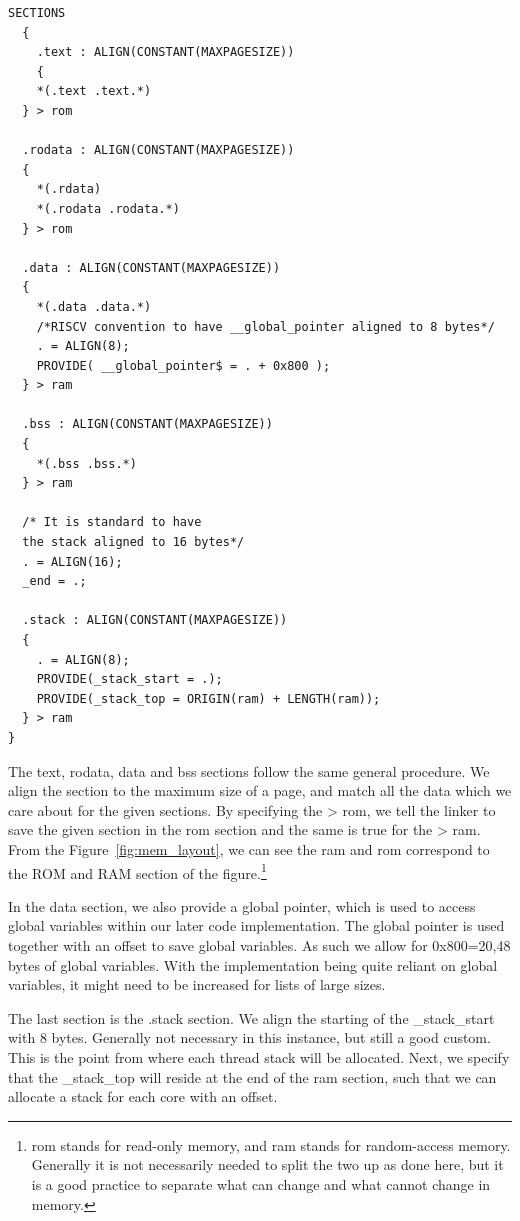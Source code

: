 \begin{lstlisting}[caption=Linker scripts SECTIONS.]
  SECTIONS
  {
    .text : ALIGN(CONSTANT(MAXPAGESIZE))
    {
    *(.text .text.*)
  } > rom

  .rodata : ALIGN(CONSTANT(MAXPAGESIZE))
  {
    *(.rdata)
    *(.rodata .rodata.*)
  } > rom

  .data : ALIGN(CONSTANT(MAXPAGESIZE))
  {
    *(.data .data.*)
    /*RISCV convention to have __global_pointer aligned to 8 bytes*/
    . = ALIGN(8);
    PROVIDE( __global_pointer$ = . + 0x800 );
  } > ram

  .bss : ALIGN(CONSTANT(MAXPAGESIZE))
  {
    *(.bss .bss.*)
  } > ram

  /* It is standard to have
  the stack aligned to 16 bytes*/
  . = ALIGN(16);
  _end = .;

  .stack : ALIGN(CONSTANT(MAXPAGESIZE))
  {
    . = ALIGN(8);
    PROVIDE(_stack_start = .);
    PROVIDE(_stack_top = ORIGIN(ram) + LENGTH(ram));
  } > ram
}
\end{lstlisting}
The text, rodata, data and bss sections follow the same general procedure. We
align the section to the maximum size of a page, and match all the data which we
care about for the given sections. By specifying the > rom, we tell the linker
to save the given section in the rom section and the same is true for the > ram.
From the Figure~\ref{fig:mem_layout}, we can see the ram and rom correspond to
the ROM and RAM section of the figure.\footnote{rom stands for read-only memory,
and ram stands for random-access memory. Generally it is not necessarily needed
to split the two up as done here, but it is a good practice to separate what can
change and what cannot change in memory.}

In the data section, we also provide a global pointer, which is used to access
global variables within our later code implementation. The global pointer is
used together with an offset to save global variables. As such we allow for
0x800=20,48 bytes of global variables. With the implementation being quite
reliant on global variables, it might need to be increased for lists of large
sizes.

The last section is the .stack section. We align the starting of the
\_stack\_start with 8 bytes. Generally not necessary in this instance, but still
a good custom. This is the point from where each thread stack will be allocated.
Next, we specify that the \_stack\_top will reside at the end of the ram
section, such that we can allocate a stack for each core with an offset.

